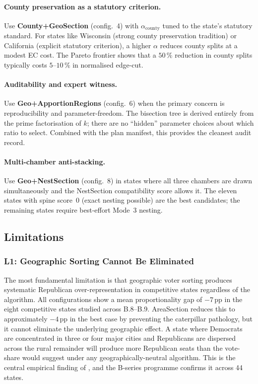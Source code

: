 \paragraph{County preservation as a statutory criterion.}
Use \textbf{County+GeoSection} (config.~4) with $\alpha_\text{county}$ tuned to
the state's statutory standard.
For states like Wisconsin (strong county preservation tradition) or California
(explicit statutory criterion), a higher $\alpha$ reduces county splits at a
modest EC cost.
The Pareto frontier shows that a $50\,\%$ reduction in county splits typically
costs $5$--$10\,\%$ in normalised edge-cut.

\paragraph{Auditability and expert witness.}
Use \textbf{Geo+ApportionRegions} (config.~6) when the primary concern is
reproducibility and parameter-freedom.
The bisection tree is derived entirely from the prime factorisation of $k$;
there are no ``hidden'' parameter choices about which ratio to select.
Combined with the plan manifest, this provides the cleanest audit record.

\paragraph{Multi-chamber anti-stacking.}
Use \textbf{Geo+NestSection} (config.~8) in states where all three chambers
are drawn simultaneously and the NestSection compatibility score allows it.
The eleven states with spine score~0 (exact nesting possible) are the best
candidates; the remaining states require best-effort Mode~3 nesting.

\subsection{Limitations}

\subsubsection*{L1: Geographic Sorting Cannot Be Eliminated}

The most fundamental limitation is that geographic voter sorting produces
systematic Republican over-representation in competitive states regardless of
the algorithm.
All configurations show a mean proportionality gap of $-7$\,pp in the eight
competitive states studied across B.8--B.9.
AreaSection reduces this to approximately $-4$\,pp in the best case by preventing
the caterpillar pathology, but it cannot eliminate the underlying geographic
effect.
A state where Democrats are concentrated in three or four major cities and
Republicans are dispersed across the rural remainder will produce more Republican
seats than the vote-share would suggest under any geographically-neutral algorithm.
This is the central empirical finding of \citet{rodden2019}, and the B-series
programme confirms it across 44 states.

